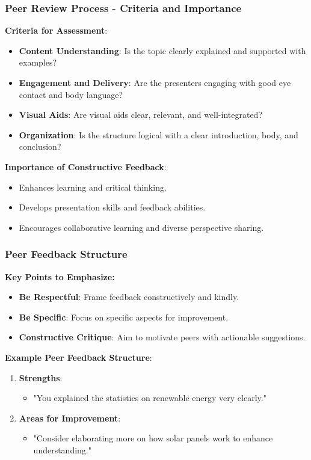 \documentclass{beamer}
\begin{document}
\begin{frame}[fragile]
    \frametitle{Peer Review Process - Criteria and Importance}
    \textbf{Criteria for Assessment}:
    \begin{itemize}
        \item \textbf{Content Understanding}: Is the topic clearly explained and supported with examples?
        \item \textbf{Engagement and Delivery}: Are the presenters engaging with good eye contact and body language?
        \item \textbf{Visual Aids}: Are visual aids clear, relevant, and well-integrated?
        \item \textbf{Organization}: Is the structure logical with a clear introduction, body, and conclusion?
    \end{itemize}

    \textbf{Importance of Constructive Feedback}:
    \begin{itemize}
        \item Enhances learning and critical thinking.
        \item Develops presentation skills and feedback abilities.
        \item Encourages collaborative learning and diverse perspective sharing.
    \end{itemize}
\end{frame}

\begin{frame}[fragile]
    \frametitle{Peer Feedback Structure}
    \textbf{Key Points to Emphasize:}
    \begin{itemize}
        \item \textbf{Be Respectful}: Frame feedback constructively and kindly.
        \item \textbf{Be Specific}: Focus on specific aspects for improvement.
        \item \textbf{Constructive Critique}: Aim to motivate peers with actionable suggestions.
    \end{itemize}
    
    \textbf{Example Peer Feedback Structure}:
    \begin{enumerate}
        \item \textbf{Strengths}: 
        \begin{itemize}
            \item "You explained the statistics on renewable energy very clearly."
        \end{itemize}
        \item \textbf{Areas for Improvement}: 
        \begin{itemize}
            \item "Consider elaborating more on how solar panels work to enhance understanding."
        \end{itemize}
    \end{enumerate}
\end{frame}
\end{document}
